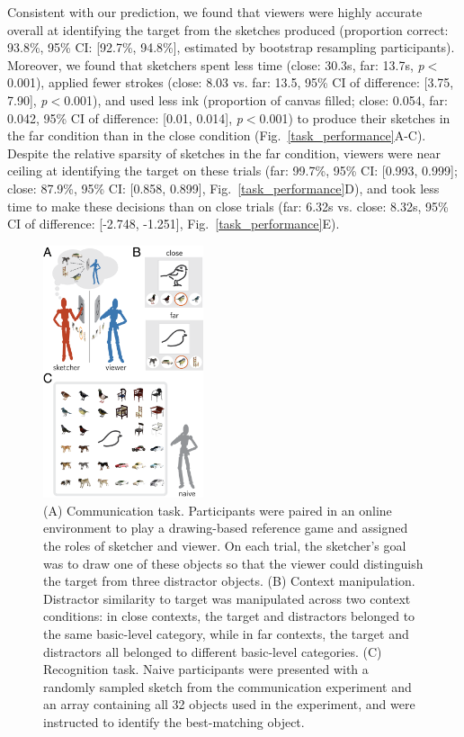 \documentclass[9pt,twocolumn,twoside]{pnas-new}
\begin{document}
Consistent with our prediction, we found that viewers were highly accurate overall at identifying the target from the sketches produced (proportion correct: 93.8\%, 95\% CI: [92.7\%, 94.8\%], estimated by bootstrap resampling participants). 
Moreover, we found that sketchers spent less time (close: 30.3s, far: 13.7s, \textit{p}$<$0.001), applied fewer strokes (close: 8.03 vs. far: 13.5, 95\% CI of difference: [3.75, 7.90], \textit{p}$<$0.001), and used less ink (proportion of canvas filled; close: 0.054, far: 0.042, 95\% CI of difference: [0.01, 0.014], \textit{p}$<$0.001) to produce their sketches in the far condition than in the close condition (Fig.~\ref{task_performance}A-C). 
Despite the relative sparsity of sketches in the far condition, viewers were near ceiling at identifying the target on these trials (far: 99.7\%, 95\% CI: [0.993, 0.999]; close: 87.9\%, 95\% CI: [0.858, 0.899], Fig.~\ref{task_performance}D), and took less time to make these decisions than on close trials (far: 6.32s vs. close: 8.32s, 95\% CI of difference: [-2.748, -1.251], Fig.~\ref{task_performance}E).

\begin{figure}[t]
\centering
\includegraphics[width=0.42\textwidth]{figures/1_task_display_alt.png}
\caption{(A) Communication task. Participants were paired in an online environment to play a drawing-based reference game and assigned the roles of sketcher and viewer. On each trial, the sketcher's goal was to draw one of these objects so that the viewer could distinguish the target from three distractor objects. (B) Context manipulation. Distractor similarity to target was manipulated across two context conditions: in close contexts, the target and distractors belonged to the same basic-level category, while in far contexts, the target and distractors all belonged to different basic-level categories. (C) Recognition task. Naive participants were presented with a randomly sampled sketch from the communication experiment and an array containing all 32 objects used in the experiment, and were instructed to identify the best-matching object.}
\label{task_display}
\end{figure}
\end{document}
